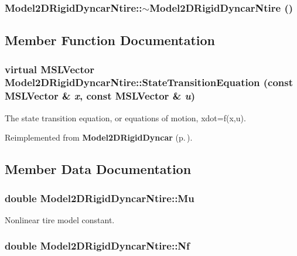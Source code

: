 \subsubsection{\setlength{\rightskip}{0pt plus 5cm}Model2DRigid\-Dyncar\-Ntire::$\sim$Model2DRigid\-Dyncar\-Ntire ()\hspace{0.3cm}{\tt  [inline, virtual]}}\label{class_Model2DRigidDyncarNtire_a1}




\subsection{Member Function Documentation}
\subsubsection{\setlength{\rightskip}{0pt plus 5cm}virtual {\bf MSLVector} Model2DRigid\-Dyncar\-Ntire::State\-Transition\-Equation (const {\bf MSLVector} \& {\em x}, const {\bf MSLVector} \& {\em u})\hspace{0.3cm}{\tt  [virtual]}}\label{class_Model2DRigidDyncarNtire_a2}


The state transition equation, or equations of motion, xdot=f(x,u).



Reimplemented from {\bf Model2DRigid\-Dyncar} {\rm (p.\,\pageref{class_Model2DRigidDyncar_a4})}.

\subsection{Member Data Documentation}
\subsubsection{\setlength{\rightskip}{0pt plus 5cm}double Model2DRigid\-Dyncar\-Ntire::Mu}\label{class_Model2DRigidDyncarNtire_m0}


Nonlinear tire model constant.

\subsubsection{\setlength{\rightskip}{0pt plus 5cm}double Model2DRigid\-Dyncar\-Ntire::Nf}\label{class_Model2DRigidDyncarNtire_m1}


